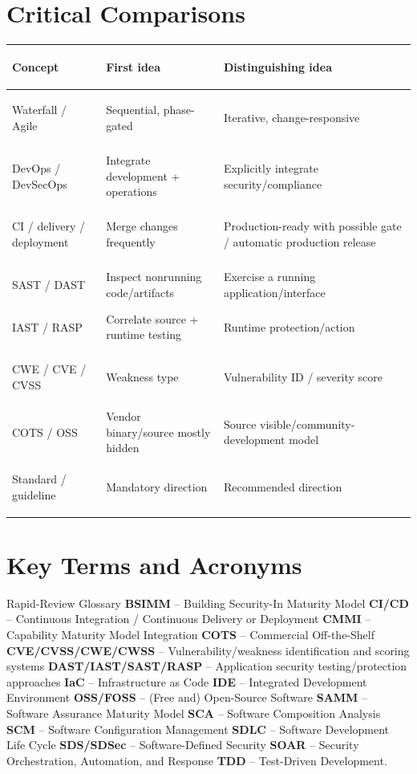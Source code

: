 \documentclass[10pt,letterpaper]{article}
\begin{document}
\section{Critical Comparisons}
\begin{center}\small
\begin{tabularx}{\textwidth}{>{\bfseries\color{Navy}\raggedright\arraybackslash}p{}>{\raggedright\arraybackslash}X>{\raggedright\arraybackslash}X}
\toprule Concept & First idea & Distinguishing idea\\\midrule
Waterfall / Agile & Sequential, phase-gated & Iterative, change-responsive\\
DevOps / DevSecOps & Integrate development + operations & Explicitly integrate security/compliance\\
CI / delivery / deployment & Merge changes frequently & Production-ready with possible gate / automatic production release\\
SAST / DAST & Inspect nonrunning code/artifacts & Exercise a running application/interface\\
IAST / RASP & Correlate source + runtime testing & Runtime protection/action\\
CWE / CVE / CVSS & Weakness type & Vulnerability ID / severity score\\
COTS / OSS & Vendor binary/source mostly hidden & Source visible/community-development model\\
Standard / guideline & Mandatory direction & Recommended direction\\
\bottomrule
\end{tabularx}
\end{center}

\section{Key Terms and Acronyms}
\begin{summarybox}{Rapid-Review Glossary}
\textbf{BSIMM} -- Building Security-In Maturity Model \quad
\textbf{CI/CD} -- Continuous Integration / Continuous Delivery or Deployment \quad
\textbf{CMMI} -- Capability Maturity Model Integration \quad
\textbf{COTS} -- Commercial Off-the-Shelf \quad
\textbf{CVE/CVSS/CWE/CWSS} -- Vulnerability/weakness identification and scoring systems \quad
\textbf{DAST/IAST/SAST/RASP} -- Application security testing/protection approaches \quad
\textbf{IaC} -- Infrastructure as Code \quad
\textbf{IDE} -- Integrated Development Environment \quad
\textbf{OSS/FOSS} -- (Free and) Open-Source Software \quad
\textbf{SAMM} -- Software Assurance Maturity Model \quad
\textbf{SCA} -- Software Composition Analysis \quad
\textbf{SCM} -- Software Configuration Management \quad
\textbf{SDLC} -- Software Development Life Cycle \quad
\textbf{SDS/SDSec} -- Software-Defined Security \quad
\textbf{SOAR} -- Security Orchestration, Automation, and Response \quad
\textbf{TDD} -- Test-Driven Development.
\end{summarybox}
\end{document}
